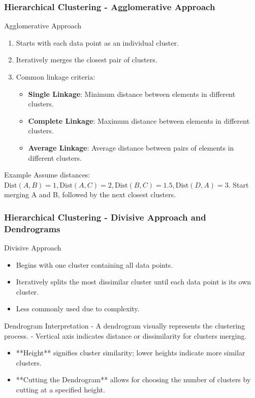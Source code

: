 \documentclass[aspectratio=169]{beamer}
\begin{document}
\begin{frame}[fragile]
    \frametitle{Hierarchical Clustering - Agglomerative Approach}
    \begin{block}{Agglomerative Approach}
        \begin{enumerate}
            \item Starts with each data point as an individual cluster.
            \item Iteratively merges the closest pair of clusters.
            \item Common linkage criteria:
            \begin{itemize}
                \item \textbf{Single Linkage}: Minimum distance between elements in different clusters.
                \item \textbf{Complete Linkage}: Maximum distance between elements in different clusters.
                \item \textbf{Average Linkage}: Average distance between pairs of elements in different clusters.
            \end{itemize}
        \end{enumerate}
    \end{block}

    \begin{block}{Example}
        Assume distances: 
        \( \text{Dist}(A, B) = 1, \text{Dist}(A, C) = 2, \text{Dist}(B, C) = 1.5, \text{Dist}(D, A) = 3 \).
        Start merging A and B, followed by the next closest clusters.
    \end{block}
\end{frame}

\begin{frame}[fragile]
    \frametitle{Hierarchical Clustering - Divisive Approach and Dendrograms}
    \begin{block}{Divisive Approach}
        \begin{itemize}
            \item Begins with one cluster containing all data points.
            \item Iteratively splits the most dissimilar cluster until each data point is its own cluster.
            \item Less commonly used due to complexity.
        \end{itemize}
    \end{block}

    \begin{block}{Dendrogram Interpretation}
        - A dendrogram visually represents the clustering process.
        - Vertical axis indicates distance or dissimilarity for clusters merging.
        \begin{itemize}
            \item **Height** signifies cluster similarity; lower heights indicate more similar clusters.
            \item **Cutting the Dendrogram** allows for choosing the number of clusters by cutting at a specified height.
        \end{itemize}
    \end{block}
\end{frame}
\end{document}
